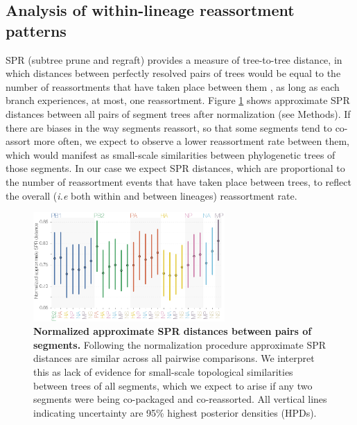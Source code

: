 \documentclass[11pt,oneside,letterpaper]{article}
\begin{document}
\subsection*{Analysis of within-lineage reassortment patterns}
SPR (subtree prune and regraft) provides a measure of tree-to-tree distance, in which distances between perfectly resolved pairs of trees would be equal to the number of reassortments that have taken place between them \cite{svinti2013}, as long as each branch experiences, at most, one reassortment.
Figure \ref{SPRdistances} shows approximate SPR distances between all pairs of segment trees after normalization (see Methods).
If there are biases in the way segments reassort, so that some segments tend to co-assort more often, we expect to observe a lower reassortment rate between them, which would manifest as small-scale similarities between phylogenetic trees of those segments.
In our case we expect SPR distances, which are proportional to the number of reassortment events that have taken place between trees, to reflect the overall (\textit{i.e} both within and between lineages) reassortment rate.

\begin{figure}[h]
	\centering		
	\includegraphics[width=0.65\textwidth]{figures/InfB_normalizedApproxSPR.png}
	\caption{\textbf{Normalized approximate SPR distances between pairs of segments.}
Following the normalization procedure approximate SPR distances are similar across all pairwise comparisons.
We interpret this as lack of evidence for small-scale topological similarities between trees of all segments, which we expect to arise if any two segments were being co-packaged and co-reassorted.
All vertical lines indicating uncertainty are 95\% highest posterior densities (HPDs).}
	\label{SPRdistances}
\end{figure}
\end{document}
